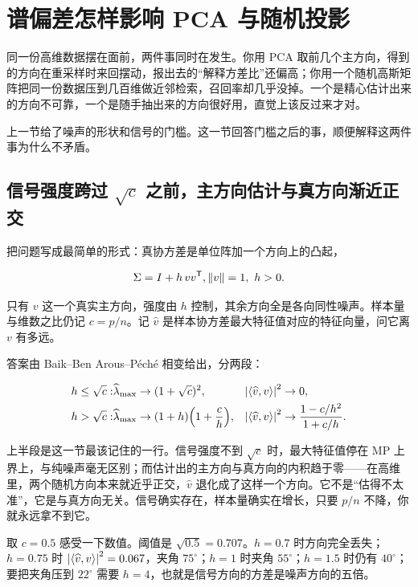 \section{谱偏差怎样影响 PCA 与随机投影}
\label{sec:11-Mathematical-Statistics/09-Random-Matrix-Theory/03}

同一份高维数据摆在面前，两件事同时在发生。你用 PCA 取前几个主方向，得到的方向在重采样时来回摆动，报出去的``解释方差比''还偏高；你用一个随机高斯矩阵把同一份数据压到几百维做近邻检索，召回率却几乎没掉。一个是精心估计出来的方向不可靠，一个是随手抽出来的方向很好用，直觉上该反过来才对。

上一节给了噪声的形状和信号的门槛。这一节回答门槛之后的事，顺便解释这两件事为什么不矛盾。

\subsection{信号强度跨过 \(\sqrt c\) 之前，主方向估计与真方向渐近正交}

把问题写成最简单的形式：真协方差是单位阵加一个方向上的凸起，

\[
\Sigma=I+h\,vv^{\mathsf{T}},\space \left\lVert v\right\rVert=1,\ h>0 .
\]

只有 \(v\) 这一个真实主方向，强度由 \(h\) 控制，其余方向全是各向同性噪声。样本量与维数之比仍记 \(c=p/n\)。记 \(\widehat v\) 是样本协方差最大特征值对应的特征向量，问它离 \(v\) 有多远。

答案由 Baik--Ben Arous--Péché 相变给出，分两段：

\[
\begin{aligned}
h\le\sqrt c:\space &\widehat\lambda_{\max}\to(1+\sqrt c)^2, &\space \left|\left\langle\widehat v,v\right\rangle\right|^2&\to 0,\\
h>\sqrt c:\space &\widehat\lambda_{\max}\to(1+h)\Bigl(1+\frac ch\Bigr), &\space \left|\left\langle\widehat v,v\right\rangle\right|^2&\to\frac{1-c/h^2}{1+c/h}.
\end{aligned}
\]

上半段是这一节最该记住的一行。信号强度不到 \(\sqrt c\) 时，最大特征值停在 MP 上界上，与纯噪声毫无区别；而估计出的主方向与真方向的内积趋于零——在高维里，两个随机方向本来就近乎正交，\(\widehat v\) 退化成了这样一个方向。它不是``估得不太准''，它是与真方向无关。信号确实存在，样本量确实在增长，只要 \(p/n\) 不降，你就永远拿不到它。

取 \(c=0.5\) 感受一下数值。阈值是 \(\sqrt{0.5}=0.707\)。\(h=0.7\) 时方向完全丢失；\(h=0.75\) 时 \(\left|\left\langle\widehat v,v\right\rangle\right|^2=0.067\)，夹角 \(75^\circ\)；\(h=1\) 时夹角 \(55^\circ\)；\(h=1.5\) 时仍有 \(40^\circ\)；要把夹角压到 \(22^\circ\) 需要 \(h=4\)，也就是信号方向的方差是噪声方向的五倍。


